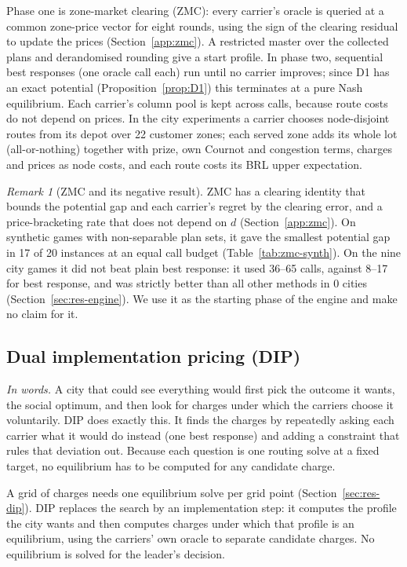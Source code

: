 \documentclass[preprint,11pt]{elsarticle}
\theoremstyle{definition}
\theoremstyle{remark}
\newtheorem{remark}[theorem]{Remark}
\begin{document}
Phase one is zone-market clearing (ZMC): every carrier's oracle is queried at a common zone-price vector for eight rounds, using the sign of the clearing residual to update the prices (Section~\ref{app:zmc}). A restricted master over the collected plans and derandomised rounding give a start profile. In phase two, sequential best responses (one oracle call each) run until no carrier improves; since D1 has an exact potential (Proposition~\ref{prop:D1}) this terminates at a pure Nash equilibrium. Each carrier's column pool is kept across calls, because route costs do not depend on prices. In the city experiments a carrier chooses node-disjoint routes from its depot over 22 customer zones; each served zone adds its whole lot (all-or-nothing) together with prize, own Cournot and congestion terms, charges and prices as node costs, and each route costs its BRL upper expectation.

\begin{remark}[ZMC and its negative result]\label{rem:zmc}
ZMC has a clearing identity that bounds the potential gap and each carrier's regret by the clearing error, and a price-bracketing rate that does not depend on $d$ (Section~\ref{app:zmc}). On synthetic games with non-separable plan sets, it gave the smallest potential gap in 17 of 20 instances at an equal call budget (Table~\ref{tab:zmc-synth}). On the nine city games it did not beat plain best response: it used 36--65 calls, against 8--17 for best response, and was strictly better than all other methods in 0 cities (Section~\ref{sec:res-engine}). We use it as the starting phase of the engine and make no claim for it.
\end{remark}

\subsection{Dual implementation pricing (DIP)}\label{sec:dip}

\emph{In words.} A city that could see everything would first pick the outcome it wants, the social optimum, and then look for charges under which the carriers choose it voluntarily. DIP does exactly this. It finds the charges by repeatedly asking each carrier what it would do instead (one best response) and adding a constraint that rules that deviation out. Because each question is one routing solve at a fixed target, no equilibrium has to be computed for any candidate charge.

A grid of charges needs one equilibrium solve per grid point (Section~\ref{sec:res-dip}). DIP replaces the search by an implementation step: it computes the profile the city wants and then computes charges under which that profile is an equilibrium, using the carriers' own oracle to separate candidate charges. No equilibrium is solved for the leader's decision.
\end{document}
